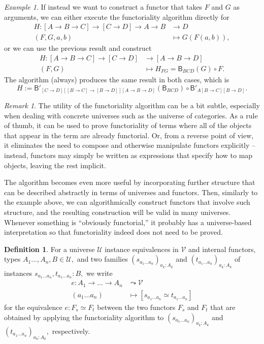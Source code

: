\documentclass[a4paper]{article}
\theoremstyle{definition}
\newtheorem{definition}{Definition}[section]
\theoremstyle{remark}
\newtheorem*{remark}{Remark}
\newtheorem*{example}{Example}
\renewcommand{\equiv}{\simeq}
\newcommand{\U}{\mathcal{U}}
\newcommand{\V}{\mathcal{V}}
\newcommand{\nm}{\mathsf}
\newcommand{\combinator}{\nm}
\newcommand{\compFun}{\combinator{B'}}
\newcommand{\revCompFun}{\combinator{B}}
\begin{document}
\begin{example}
  If instead we want to construct a functor that takes $F$ and $G$ as
  arguments, we can either execute the functoriality algorithm directly for
  \begin{align*}
    H : [A \to B \to C] \to [C \to D] \to A \to B &\to     D\\
        (F,G,a,b)                                 &\mapsto G(F(a,b)),
  \end{align*}
  or we can use the previous result and construct
  \begin{align*}
    H : [A \to B \to C] \to [C \to D] &\to     [A \to B \to D]\\
        (F,G)                         &\mapsto H_{FG} = \revCompFun_{BCD}(G) \circ F.
  \end{align*}
  The algorithm (always) produces the same result in both cases, which is
  \[H := \compFun_{[C{\to}D][[B{\to}C]{\to}[B{\to}D]][A{\to}B{\to}D]}(\revCompFun_{BCD}) \circ \compFun_{A[B{\to}C][B{\to}D]}.\]
\end{example}

\begin{remark}
  The utility of the functoriality algorithm can be a bit subtle, especially when dealing
  with concrete universes such as the universe of categories. As a rule of thumb, it can
  be used to prove functoriality of terms where all of the objects that appear in the term
  are already functorial. Or, from a reverse point of view, it eliminates the need to
  compose and otherwise manipulate functors explicitly -- instead, functors may simply be
  written as expressions that specify how to map objects, leaving the rest implicit.

  The algorithm becomes even more useful by incorporating further structure that can be
  described abstractly in terms of universes and functors. Then, similarly to the example
  above, we can algorithmically construct functors that involve such structure, and the
  resulting construction will be valid in many universes. Whenever something is
  ``obviously functorial,'' it probably has a universe-based interpretation so that
  functoriality indeed does not need to be proved.
\end{remark}

\begin{definition}
  For a universe $\U$ instance equivalences in $\V$ and internal functors,
  types $A_1\ldots,A_n,B \in \U,$ and two families
  $(s_{a_1 \ldots a_n})_{a_k : A_k}$ and $(t_{a_1 \ldots a_n})_{a_k : A_k}$
  of instances $s_{a_1 \ldots a_n},t_{a_1 \ldots a_n} : B,$ we write
  \begin{align*}
    e : A_1 \to \dots \to A_n &\leadsto \V\\
        (a_1 \ldots a_n)      &\mapsto  [s_{a_1 \ldots a_n} \equiv t_{a_1 \ldots a_n}]
  \end{align*}
  for the equivalence $e : F_s \equiv F_t$ between the two functors $F_s$ and $F_t$
  that are obtained by applying the functoriality algorithm to
  $(s_{a_1 \ldots a_n})_{a_k : A_k}$ and $(t_{a_1 \ldots a_n})_{a_k : A_k},$
  respectively.
\end{definition}
\end{document}
